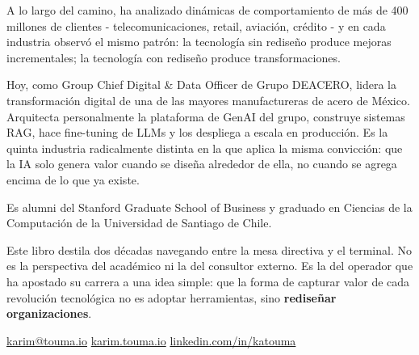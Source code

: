 \documentclass[$if(classoption)$$for(classoption)$$classoption$$sep$,$endfor$$endif$]{paradigma-agentico}
\begin{document}
\vspace{0.6em}
\noindent A lo largo del camino, ha analizado din\'{a}micas de comportamiento de
m\'{a}s de 400 millones de clientes - telecomunicaciones, retail, aviaci\'{o}n,
cr\'{e}dito - y en cada industria observ\'{o} el mismo patr\'{o}n: la tecnolog\'{i}a
sin redise\~{n}o produce mejoras incrementales; la tecnolog\'{i}a con redise\~{n}o
produce transformaciones.

\vspace{0.6em}
\noindent Hoy, como Group Chief Digital \& Data Officer de Grupo DEACERO, lidera
la transformaci\'{o}n digital de una de las mayores manufactureras de acero de
M\'{e}xico. Arquitecta personalmente la plataforma de GenAI del grupo, construye
sistemas RAG, hace fine-tuning de LLMs y los despliega a escala en
producci\'{o}n. Es la quinta industria radicalmente distinta en la que aplica la
misma convicci\'{o}n: que la IA solo genera valor cuando se dise\~{n}a alrededor
de ella, no cuando se agrega encima de lo que ya existe.

\vspace{0.6em}
\noindent Es alumni del Stanford Graduate School of Business y graduado en Ciencias
de la Computaci\'{o}n de la Universidad de Santiago de Chile.

\vspace{0.6em}
\noindent Este libro destila dos d\'{e}cadas navegando entre la mesa directiva y el
terminal. No es la perspectiva del acad\'{e}mico ni la del consultor externo. Es
la del operador que ha apostado su carrera a una idea simple: que la forma de
capturar valor de cada revoluci\'{o}n tecnol\'{o}gica no es adoptar herramientas,
sino \textbf{redise\~{n}ar organizaciones}.

\vspace{1.2em}
\begin{center}
\sffamily\small
\faEnvelope\enspace\href{mailto:karim@touma.io}{karim@touma.io}\qquad
\faGlobe\enspace\href{https://karim.touma.io}{karim.touma.io}\qquad
\faLinkedin\enspace\href{https://www.linkedin.com/in/katouma}{linkedin.com/in/katouma}
\end{center}
\end{document}

